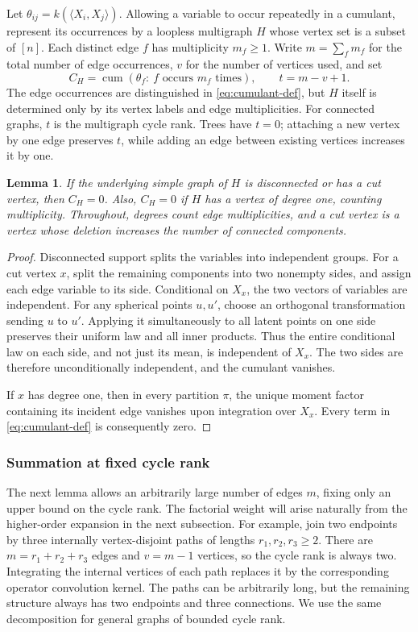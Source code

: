 \documentclass[11pt,reqno]{amsart}
\numberwithin{equation}{section}
\newtheorem{lemma}[theorem]{Lemma}
\theoremstyle{definition}
\theoremstyle{remark}
\theoremstyle{definition}
\DeclareMathOperator{\cum}{cum}
\begin{document}
Let $\theta_{ij}=k(\langle X_i,X_j\rangle)$.
Allowing a variable to occur repeatedly in a cumulant, represent its occurrences by a loopless multigraph $H$
whose vertex set is a subset of $[n]$. Each distinct edge $f$ has multiplicity $m_f\ge1$.
Write $m=\sum_fm_f$ for the total number of edge occurrences, $v$ for the number of vertices used, and set
\[
 C_H=\cum(\theta_f:\ f\text{ occurs }m_f\text{ times}),\qquad t=m-v+1.
\]
The edge occurrences are distinguished in \eqref{eq:cumulant-def},
but $H$ itself is determined only by its vertex labels and edge multiplicities.
For connected graphs, $t$ is the multigraph cycle rank. Trees have $t=0$;
attaching a new vertex by one edge preserves $t$, while adding an edge between existing vertices increases it by one.

\begin{lemma}\label{lem:cut}
If the underlying simple graph of $H$ is disconnected or has a cut vertex, then $C_H=0$.
Also, $C_H=0$ if $H$ has a vertex of degree one, counting multiplicity.
Throughout, degrees count edge multiplicities, and a cut vertex is a vertex whose deletion increases the number of connected components.
\end{lemma}
\begin{proof}
Disconnected support splits the variables into independent groups. For a cut vertex $x$, split the remaining components into two nonempty sides,
and assign each edge variable to its side. Conditional on $X_x$, the two vectors of variables are independent.
For any spherical points $u,u'$, choose an orthogonal transformation sending $u$ to $u'$.
Applying it simultaneously to all latent points on one side preserves their uniform law and all inner products.
Thus the entire conditional law on each side, and not just its mean, is independent of $X_x$.
The two sides are therefore unconditionally independent, and the cumulant vanishes.

If $x$ has degree one, then in every partition $\pi$,
the unique moment factor containing its incident edge vanishes upon integration over $X_x$.
Every term in \eqref{eq:cumulant-def} is consequently zero.
\end{proof}

\subsubsection{Summation at fixed cycle rank}
The next lemma allows an arbitrarily large number of edges $m$, fixing only an upper bound on the cycle rank.
The factorial weight will arise naturally from the higher-order expansion in the next subsection.
For example, join two endpoints by three internally vertex-disjoint paths
of lengths $r_1,r_2,r_3\ge2$.
There are $m=r_1+r_2+r_3$ edges and $v=m-1$ vertices, so the cycle rank is always two.
Integrating the internal vertices of each path replaces it by the corresponding operator convolution kernel.
The paths can be arbitrarily long, but the remaining structure always has two endpoints and three connections.
We use the same decomposition for general graphs of bounded cycle rank.
\end{document}
